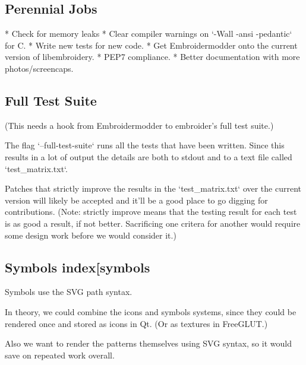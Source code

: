 \subsection{Perennial Jobs}

* Check for memory leaks
* Clear compiler warnings on `-Wall -ansi -pedantic` for C.
* Write new tests for new code.
* Get Embroidermodder onto the current version of libembroidery.
* PEP7 compliance.
* Better documentation with more photos/screencaps.

\subsection{Full Test Suite}

(This needs a hook from Embroidermodder to embroider's full test suite.)

The flag `--full-test-suite` runs all the tests that have been written.
Since this results in a lot of output the details are both to stdout
and to a text file called `test_matrix.txt`.

Patches that strictly improve the results in the `test_matrix.txt` over
the current version will likely be accepted and it'll be a good place
to go digging for contributions. (Note: strictly improve means that
the testing result for each test is as good a result, if not better.
Sacrificing one critera for another would require some design work
before we would consider it.)

\subsection{Symbols
index[symbols}

Symbols use the SVG path syntax.

In theory, we could combine the icons and symbols systems, since they could be
rendered once and stored as icons in Qt. (Or as textures in FreeGLUT.)

Also we want to render the patterns themselves using SVG syntax, so it would
save on repeated work overall.

